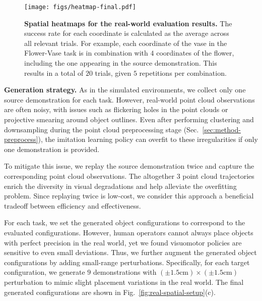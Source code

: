
\begin{figure*}
    \vspace{-0.3cm}
    \centering
    \texttt{[image: figs/heatmap-final.pdf]}
    \caption{\textbf{Spatial heatmaps for the real-world evaluation results.} 
    The success rate for each coordinate is calculated as the average across all relevant trials. For example, each coordinate of the vase in the Flower-Vase task is in combination with $4$ coordinates of the flower, including the one appearing in the source demonstration. This results in a total of $20$ trials, given $5$ repetitions per combination.}
    \label{fig:real-success-heatmap}
    \vspace{-0.2cm}
\end{figure*}





\vspace{0.2cm} \noindent\textbf{Generation strategy.}
As in the simulated environments, we collect only one source demonstration for each task. However, real-world point cloud observations are often noisy, with issues such as flickering holes in the point clouds or projective smearing around object outlines. Even after performing clustering and downsampling during the point cloud preprocessing stage (Sec.~\ref{sec:method-preprocess}), the imitation learning policy can overfit to these irregularities if only one demonstration is provided.

To mitigate this issue, we replay the source demonstration twice and capture the corresponding point cloud observations. The altogether $3$ point cloud trajectories enrich the diversity in visual degradations and help alleviate the overfitting problem. 
Since replaying twice is low-cost, we consider this approach a beneficial tradeoff between efficiency and effectiveness.

For each task, we set the generated object configurations to correspond to the evaluated configurations.
However, human operators cannot always place objects with perfect precision in the real world, yet we found visuomotor policies are sensitive to even small deviations. Thus, we further augment the generated object configurations by adding small-range perturbations. Specifically, for each target configuration, we generate $9$ demonstrations with $(\pm 1.5 \textrm{cm}) \times (\pm1.5 \textrm{cm})$ perturbation to mimic slight placement variations in the real world. The final generated configurations are shown in Fig.~\ref{fig:real-spatial-setup}(c).

